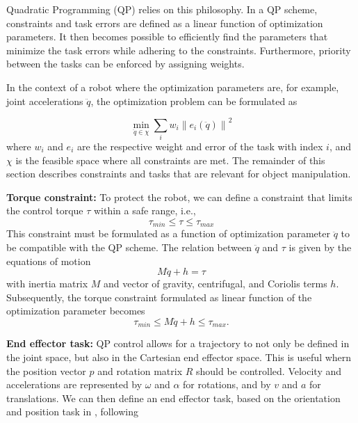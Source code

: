 \documentclass[a4paper, 10pt, conference]{ieeeconf}
\begin{document}
     Quadratic Programming (QP) relies on this philosophy. In a QP scheme, constraints and task errors are defined as a linear function of optimization parameters. It then becomes possible to efficiently find the parameters that minimize the task errors while adhering to the constraints. Furthermore, priority between the tasks can be enforced by assigning weights. 
     
     In the context of a robot where the optimization parameters are, for example, joint accelerations $\ddot{q}$, the optimization problem can be formulated as

     \begin{equation}
     \min_{\ddot{q}\in\chi}\sum_i w_i \left \| e_i(\ddot{q}) \right \|^2
     \end{equation}
     where $w_i$ and $e_i$ are the respective weight and error of the task with index $i$, and $\chi$ is the feasible space where all constraints are met. The remainder of this section describes constraints and tasks that are relevant for object manipulation.

     \textbf{Torque constraint:} To protect the robot, we can define a constraint that limits the control torque $\tau$ within a safe range, i.e.,
     \begin{equation}
       \tau_{min} \leq\tau \leq  \tau_{max} 
     \end{equation}
     This constraint must be formulated as a function of optimization parameter $\ddot q$ to be compatible with the QP scheme. The relation between $\ddot{q}$ and $\tau$ is given by the equations of motion
     \begin{equation}
        M\ddot{q}+h=\tau
     \end{equation}    
     with inertia matrix $M$ and vector of gravity, centrifugal, and Coriolis terms $h$. Subsequently, the torque constraint formulated as linear function of the optimization parameter becomes
    \begin{equation}\label{eq:eom}
     \tau_{min} \leq M\ddot{q}+h \leq  \tau_{max}.       
     \end{equation} 

    \textbf{End effector task:}
    QP control allows for a trajectory to not only be defined in the joint space, but also in the Cartesian end effector space. This is useful whern the position vector $p$ and rotation matrix $R$ should be controlled. Velocity and accelerations are represented by $\omega$ and $\alpha$ for rotations, and by $v$ and $a$ for translations. We can then define an end effector task, based on the orientation and position task in \cite{cisnerosRobustHumanoidControl2018}, following 
\end{document}
